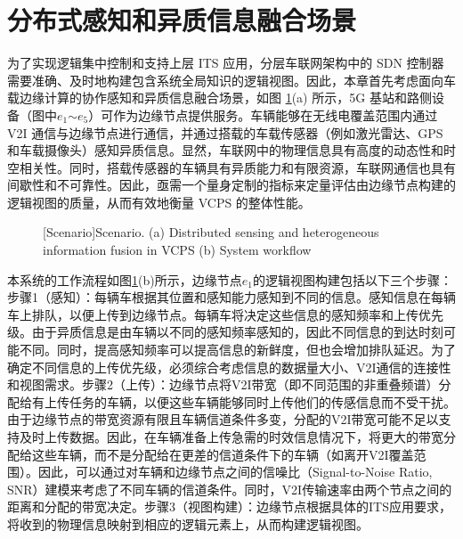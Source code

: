 \section{分布式感知和异质信息融合场景}\label{section 2-3}

为了实现逻辑集中控制和支持上层 ITS 应用，分层车联网架构中的 SDN 控制器需要准确、及时地构建包含系统全局知识的逻辑视图。因此，本章首先考虑面向车载边缘计算的协作感知和异质信息融合场景，如图 \ref{fig 2-2}(a) 所示，5G 基站和路侧设备（图中$e_1$$\sim$$e_5$）可作为边缘节点提供服务。车辆能够在无线电覆盖范围内通过 V2I 通信与边缘节点进行通信，并通过搭载的车载传感器（例如激光雷达、GPS 和车载摄像头）感知异质信息。显然，车联网中的物理信息具有高度的动态性和时空相关性。同时，搭载传感器的车辆具有异质能力和有限资源，车联网通信也具有间歇性和不可靠性。因此，亟需一个量身定制的指标来定量评估由边缘节点构建的逻辑视图的质量，从而有效地衡量 VCPS 的整体性能。

\begin{figure}[h]
     \centering
     [Scenario]{Scenario. (a) Distributed sensing and heterogeneous information fusion in VCPS (b) System workflow}
     \label{fig 2-2}
\end{figure}

本系统的工作流程如图\ref{fig 2-2}(b)所示，边缘节点$e_1$的逻辑视图构建包括以下三个步骤：步骤1（感知）：每辆车根据其位置和感知能力感知到不同的信息。感知信息在每辆车上排队，以便上传到边缘节点。每辆车将决定这些信息的感知频率和上传优先级。由于异质信息是由车辆以不同的感知频率感知的，因此不同信息的到达时刻可能不同。同时，提高感知频率可以提高信息的新鲜度，但也会增加排队延迟。为了确定不同信息的上传优先级，必须综合考虑信息的数据量大小、V2I通信的连接性和视图需求。步骤2（上传）：边缘节点将V2I带宽（即不同范围的非重叠频谱）分配给有上传任务的车辆，以便这些车辆能够同时上传他们的传感信息而不受干扰。由于边缘节点的带宽资源有限且车辆信道条件多变，分配的V2I带宽可能不足以支持及时上传数据。因此，在车辆准备上传急需的时效信息情况下，将更大的带宽分配给这些车辆，而不是分配给在更差的信道条件下的车辆（如离开V2I覆盖范围）。因此，可以通过对车辆和边缘节点之间的信噪比（Signal-to-Noise Ratio, SNR）建模来考虑了不同车辆的信道条件。同时，V2I传输速率由两个节点之间的距离和分配的带宽决定。步骤3（视图构建）：边缘节点根据具体的ITS应用要求，将收到的物理信息映射到相应的逻辑元素上，从而构建逻辑视图。

